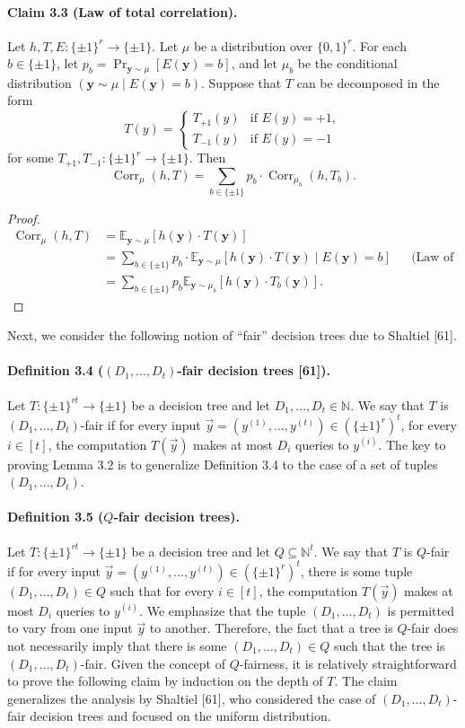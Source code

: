 \documentclass[10pt,a4paper]{article}
\newcommand{\Corr}{\operatorname{Corr}}
\begin{document}
\paragraph{Claim 3.3 (Law of total correlation).} Let $h,T,E:\{\pm1\}^r\to\{\pm1\}$. Let $\mu$ be a distribution over $\{0,1\}^r$. For each $b\in\{\pm1\}$, let $p_b=\Pr_{\mathbf y\sim\mu}[E(\mathbf y)=b]$, and let $\mu_b$ be the conditional distribution $(\mathbf y\sim\mu\mid E(\mathbf y)=b)$. Suppose that $T$ can be decomposed in the form
\[T(y)=\begin{cases}T_{+1}(y)&\text{if }E(y)=+1,\\T_{-1}(y)&\text{if }E(y)=-1\end{cases}\]
for some $T_{+1},T_{-1}:\{\pm1\}^r\to\{\pm1\}$. Then
\[\Corr_\mu(h,T)=\sum_{b\in\{\pm1\}}p_b\cdot\Corr_{\mu_b}(h,T_b).\]
\begin{proof}
\begin{align*}
\Corr_\mu(h,T)&=\mathbb E_{\mathbf y\sim\mu}[h(\mathbf y)\cdot T(\mathbf y)]\\
&=\sum_{b\in\{\pm1\}}p_b\cdot\mathbb E_{\mathbf y\sim\mu}[h(\mathbf y)\cdot T(\mathbf y)\mid E(\mathbf y)=b] &&\text{(Law of total expectation)}\\
&=\sum_{b\in\{\pm1\}}p_b\mathbb E_{\mathbf y\sim\mu_b}[h(\mathbf y)\cdot T_b(\mathbf y)].
\end{align*}
\end{proof}
Next, we consider the following notion of ``fair'' decision trees due to Shaltiel [61].
\paragraph{Definition 3.4 ($(D_1,\ldots,D_t)$-fair decision trees [61]).} Let $T:\{\pm1\}^{rt}\to\{\pm1\}$ be a decision tree and let $D_1,\ldots,D_t\in\mathbb N$. We say that $T$ is $(D_1,\ldots,D_t)$-fair if for every input $\vec y=(y^{(1)},\ldots,y^{(t)})\in(\{\pm1\}^r)^t$, for every $i\in[t]$, the computation $T(\vec y)$ makes at most $D_i$ queries to $y^{(i)}$.
The key to proving Lemma 3.2 is to generalize Definition 3.4 to the case of a set of tuples $(D_1,\ldots,D_t)$.
\paragraph{Definition 3.5 ($Q$-fair decision trees).} Let $T:\{\pm1\}^{rt}\to\{\pm1\}$ be a decision tree and let $Q\subseteq\mathbb N^t$. We say that $T$ is $Q$-fair if for every input $\vec y=(y^{(1)},\ldots,y^{(t)})\in(\{\pm1\}^r)^t$, there is some tuple $(D_1,\ldots,D_t)\in Q$ such that for every $i\in[t]$, the computation $T(\vec y)$ makes at most $D_i$ queries to $y^{(i)}$.
We emphasize that the tuple $(D_1,\ldots,D_t)$ is permitted to vary from one input $\vec y$ to another. Therefore, the fact that a tree is $Q$-fair does not necessarily imply that there is some $(D_1,\ldots,D_t)\in Q$ such that the tree is $(D_1,\ldots,D_t)$-fair. Given the concept of $Q$-fairness, it is relatively straightforward to prove the following claim by induction on the depth of $T$. The claim generalizes the analysis by Shaltiel [61], who considered the case of $(D_1,\ldots,D_t)$-fair decision trees and focused on the uniform distribution.
\end{document}
